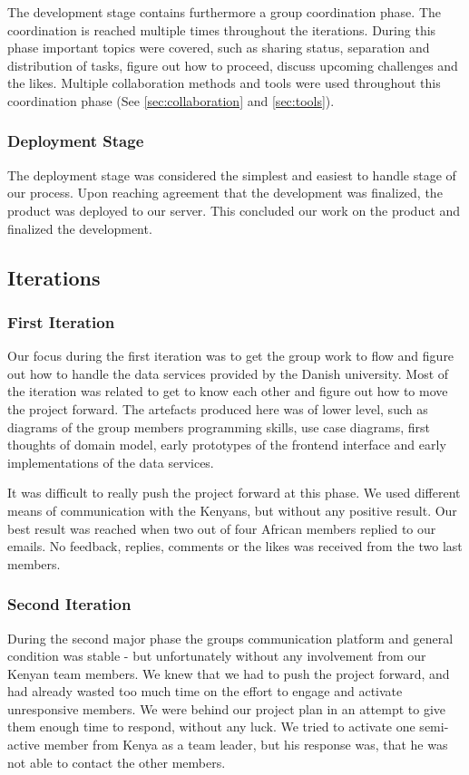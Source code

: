 The development stage contains furthermore a group coordination phase. The coordination is reached multiple times throughout the iterations. During this phase important topics were covered, such as sharing status, separation and distribution of tasks, figure out how to proceed, discuss upcoming challenges and the likes. Multiple collaboration methods and tools were used throughout this coordination phase (See \ref{sec:collaboration} and \ref{sec:tools}).

\subsubsection{Deployment Stage}
The deployment stage was considered the simplest and easiest to handle stage of our process. Upon reaching agreement that the development was finalized, the product was deployed to our server. This concluded our work on the product and finalized the development.

\subsection{Iterations} \label{subsec:iterations}
\subsubsection{First Iteration}
Our focus during the first iteration was to get the group work to flow and figure out how to handle the data services provided by the Danish university. Most of the iteration was related to get to know each other and figure out how to move the project forward. The artefacts produced here was of lower level, such as diagrams of the group members programming skills, use case diagrams, first thoughts of domain model, early prototypes of the frontend interface and early implementations of the data services.

It was difficult to really push the project forward at this phase. We used different means of communication with the Kenyans, but without any positive result. Our best result was reached when two out of four African members replied to our emails. No feedback, replies, comments or the likes was received from the two last members.

\subsubsection{Second Iteration}
During the second major phase the groups communication platform and general condition was stable - but unfortunately without any involvement from our Kenyan team members. We knew that we had to push the project forward, and had already wasted too much time on the effort to engage and activate unresponsive members. We were behind our project plan in an attempt to give them enough time to respond, without any luck. We tried to activate one semi-active member from Kenya as a team leader, but his response was, that he was not able to contact the other members.

